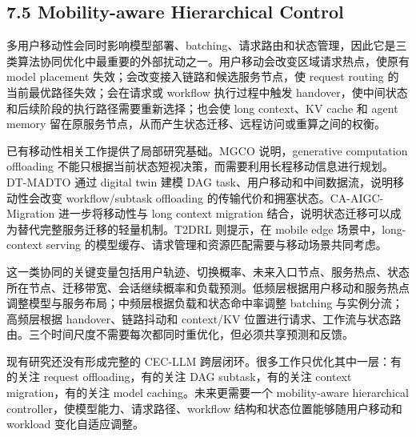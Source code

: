 \subsection*{7.5 Mobility-aware Hierarchical Control}

多用户移动性会同时影响模型部署、batching、请求路由和状态管理，因此它是三类算法协同优化中最重要的外部扰动之一。用户移动会改变区域请求热点，使原有 model placement 失效；会改变接入链路和候选服务节点，使 request routing 的当前最优路径失效；会在请求或 workflow 执行过程中触发 handover，使中间状态和后续阶段的执行路径需要重新选择；也会使 long context、KV cache 和 agent memory 留在原服务节点，从而产生状态迁移、远程访问或重算之间的权衡。

已有移动性相关工作提供了局部研究基础。MGCO \cite{ghosh2025mgco} 说明，generative computation offloading 不能只根据当前状态短视决策，而需要利用长程移动信息进行规划。DT-MADTO \cite{chen2024mobility} 通过 digital twin 建模 DAG task、用户移动和中间数据流，说明移动性会改变 workflow/subtask offloading 的传输代价和拥塞状态。CA-AIGC-Migration \cite{wang2026context} 进一步将移动性与 long context migration 结合，说明状态迁移可以成为替代完整服务迁移的轻量机制。T2DRL \cite{xu2026serving} 则提示，在 mobile edge 场景中，long-context serving 的模型缓存、请求管理和资源匹配需要与移动场景共同考虑。

这一类协同的关键变量包括用户轨迹、切换概率、未来入口节点、服务热点、状态所在节点、迁移带宽、会话继续概率和负载预测。低频层根据用户移动和服务热点调整模型与服务布局；中频层根据负载和状态命中率调整 batching 与实例分流；高频层根据 handover、链路抖动和 context/KV 位置进行请求、工作流与状态路由。三个时间尺度不需要每次都同时重优化，但必须共享预测和反馈。

现有研究还没有形成完整的 CEC-LLM 跨层闭环。很多工作只优化其中一层：有的关注 request offloading，有的关注 DAG subtask，有的关注 context migration，有的关注 model caching。未来更需要一个 mobility-aware hierarchical controller，使模型能力、请求路径、workflow 结构和状态位置能够随用户移动和 workload 变化自适应调整。




